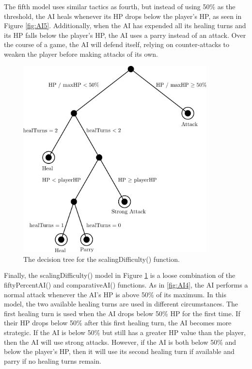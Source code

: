The fifth model uses similar tactics as fourth, but instead of using 50\% as the threshold, the AI heals whenever its HP drops below the player's HP, as seen in Figure \ref{fig:AI5}. Additionally, when the AI has expended all its healing turns and its HP falls below the player's HP, the AI uses a parry instead of an attack. Over the course of a game, the AI will defend itself, relying on counter-attacks to weaken the player before making attacks of its own.

\begin{figure}[H]
  \centering
  \includegraphics[width=10cm]{figures/AIScaling.png}
  \caption{The decision tree for the scalingDifficulty() function.}
  \label{fig:AI6}
\end{figure}

Finally, the scalingDifficulty() model in Figure \ref{fig:AI6} is a loose combination of the fiftyPercentAI() and comparativeAI() functions. As in \ref{fig:AI4}, the AI performs a normal attack whenever the AI's HP is above 50\% of its maximum. In this model, the two available healing turns are used in different circumstances. The first healing turn is used when the AI drops below 50\% HP for the first time. If their HP drops below 50\% after this first healing turn, the AI becomes more strategic. If the AI is below 50\% but still has a greater HP value than the player, then the AI will use strong attacks. However, if the AI is both below 50\% and below the player's HP, then it will use its second healing turn if available and parry if no healing turns remain.\\

